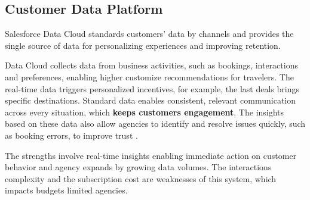 \subsection{Customer Data Platform}
Salesforce Data Cloud standards customers' data by channels and provides the single source of data for personalizing experiences and improving retention. 

Data Cloud collects data from business activities, such as bookings, interactions and preferences, enabling higher customize recommendations for travelers. The real-time data triggers personalized incentives, for example, the last deals brings specific destinations. Standard data enables consistent, relevant communication across every situation, which \textbf{keeps customers engagement}. The insights based on these data also allow agencies to identify and resolve issues quickly, such as booking errors, to improve trust \cite{SalesforceDataCloud2025}. 

The strengths involve real-time insights enabling immediate action on customer behavior and agency expands by growing data volumes. The interactions complexity and the subscription cost are weaknesses of this system, which impacts budgets limited agencies.
